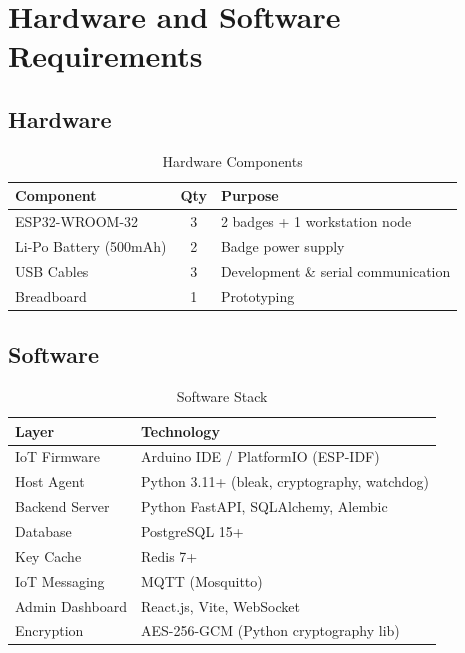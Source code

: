 \documentclass[conference]{IEEEtran}
\begin{document}
\section{Hardware and Software Requirements}

\subsection{Hardware}
\begin{table}[htbp]
    \centering
    \caption{Hardware Components}
    \label{tab:hardware}
    \begin{tabularx}{\columnwidth}{l c X}
        \toprule
        \textbf{Component} & \textbf{Qty} & \textbf{Purpose} \\
        \midrule
        ESP32-WROOM-32 & 3 & 2 badges + 1 workstation node \\
        Li-Po Battery (500mAh) & 2 & Badge power supply \\
        USB Cables & 3 & Development \& serial communication \\
        Breadboard & 1 & Prototyping \\
        \bottomrule
    \end{tabularx}
\end{table}

\subsection{Software}
\begin{table}[htbp]
    \centering
    \caption{Software Stack}
    \label{tab:software}
    \begin{tabularx}{\columnwidth}{l X}
        \toprule
        \textbf{Layer} & \textbf{Technology} \\
        \midrule
        IoT Firmware & Arduino IDE / PlatformIO (ESP-IDF) \\
        Host Agent & Python 3.11+ (bleak, cryptography, watchdog) \\
        Backend Server & Python FastAPI, SQLAlchemy, Alembic \\
        Database & PostgreSQL 15+ \\
        Key Cache & Redis 7+ \\
        IoT Messaging & MQTT (Mosquitto) \\
        Admin Dashboard & React.js, Vite, WebSocket \\
        Encryption & AES-256-GCM (Python cryptography lib) \\
        \bottomrule
    \end{tabularx}
\end{table}
\end{document}
